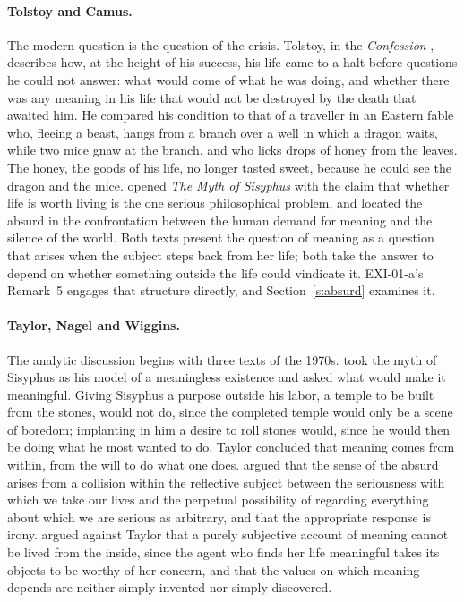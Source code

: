 \paragraph{Tolstoy and Camus.} The modern question is the question of the crisis. Tolstoy, in the \emph{Confession} \citep{Tolstoy1987}, describes how, at the height of his success, his life came to a halt before questions he could not answer: what would come of what he was doing, and whether there was any meaning in his life that would not be destroyed by the death that awaited him. He compared his condition to that of a traveller in an Eastern fable who, fleeing a beast, hangs from a branch over a well in which a dragon waits, while two mice gnaw at the branch, and who licks drops of honey from the leaves. The honey, the goods of his life, no longer tasted sweet, because he could see the dragon and the mice. \citet{Camus1955} opened \emph{The Myth of Sisyphus} with the claim that whether life is worth living is the one serious philosophical problem, and located the absurd in the confrontation between the human demand for meaning and the silence of the world. Both texts present the question of meaning as a question that arises when the subject steps back from her life; both take the answer to depend on whether something outside the life could vindicate it. EXI-01-a's Remark~5 engages that structure directly, and Section~\ref{s:absurd} examines it.

\paragraph{Taylor, Nagel and Wiggins.} The analytic discussion begins with three texts of the 1970s. \citet[ch.~18]{Taylor1970} took the myth of Sisyphus as his model of a meaningless existence and asked what would make it meaningful. Giving Sisyphus a purpose outside his labor, a temple to be built from the stones, would not do, since the completed temple would only be a scene of boredom; implanting in him a desire to roll stones would, since he would then be doing what he most wanted to do. Taylor concluded that meaning comes from within, from the will to do what one does. \citet{Nagel1971} argued that the sense of the absurd arises from a collision within the reflective subject between the seriousness with which we take our lives and the perpetual possibility of regarding everything about which we are serious as arbitrary, and that the appropriate response is irony. \citet{Wiggins1976} argued against Taylor that a purely subjective account of meaning cannot be lived from the inside, since the agent who finds her life meaningful takes its objects to be worthy of her concern, and that the values on which meaning depends are neither simply invented nor simply discovered.

